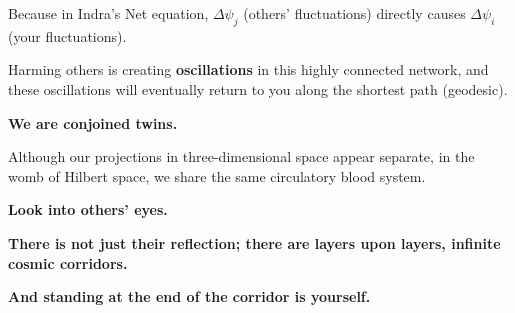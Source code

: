 Because in Indra's Net equation, $\Delta \psi_j$ (others' fluctuations) directly causes $\Delta \psi_i$ (your fluctuations).

Harming others is creating \textbf{oscillations} in this highly connected network, and these oscillations will eventually return to you along the shortest path (geodesic).

\textbf{We are conjoined twins.}

Although our projections in three-dimensional space appear separate, in the womb of Hilbert space, we share the same circulatory blood system.

\textbf{Look into others' eyes.}

\textbf{There is not just their reflection; there are layers upon layers, infinite cosmic corridors.}

\textbf{And standing at the end of the corridor is yourself.}

